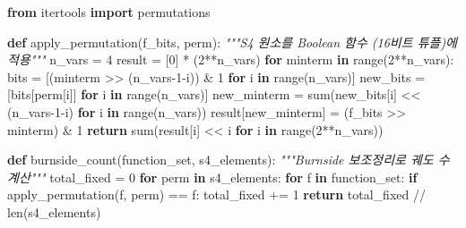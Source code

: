 \documentclass[
]{article}
\newenvironment{Shaded}{}{}
\newcommand{\BuiltInTok}[1]{\textcolor[rgb]{0.00,0.50,0.00}{#1}}
\newcommand{\CommentTok}[1]{\textcolor[rgb]{0.38,0.63,0.69}{\textit{#1}}}
\newcommand{\ControlFlowTok}[1]{\textcolor[rgb]{0.00,0.44,0.13}{\textbf{#1}}}
\newcommand{\DecValTok}[1]{\textcolor[rgb]{0.25,0.63,0.44}{#1}}
\newcommand{\ImportTok}[1]{\textcolor[rgb]{0.00,0.50,0.00}{\textbf{#1}}}
\newcommand{\KeywordTok}[1]{\textcolor[rgb]{0.00,0.44,0.13}{\textbf{#1}}}
\newcommand{\NormalTok}[1]{#1}
\newcommand{\OperatorTok}[1]{\textcolor[rgb]{0.40,0.40,0.40}{#1}}
\begin{document}
\begin{Shaded}
\begin{Highlighting}[]
\ImportTok{from}\NormalTok{ itertools }\ImportTok{import}\NormalTok{ permutations}

\KeywordTok{def}\NormalTok{ apply\_permutation(f\_bits, perm):}
    \CommentTok{"""S4 원소를 Boolean 함수 (16비트 튜플)에 적용"""}
\NormalTok{    n\_vars }\OperatorTok{=} \DecValTok{4}
\NormalTok{    result }\OperatorTok{=}\NormalTok{ [}\DecValTok{0}\NormalTok{] }\OperatorTok{*}\NormalTok{ (}\DecValTok{2}\OperatorTok{**}\NormalTok{n\_vars)}
    \ControlFlowTok{for}\NormalTok{ minterm }\KeywordTok{in} \BuiltInTok{range}\NormalTok{(}\DecValTok{2}\OperatorTok{**}\NormalTok{n\_vars):}
\NormalTok{        bits }\OperatorTok{=}\NormalTok{ [(minterm }\OperatorTok{\textgreater{}\textgreater{}}\NormalTok{ (n\_vars}\OperatorTok{{-}}\DecValTok{1}\OperatorTok{{-}}\NormalTok{i)) }\OperatorTok{\&} \DecValTok{1} \ControlFlowTok{for}\NormalTok{ i }\KeywordTok{in} \BuiltInTok{range}\NormalTok{(n\_vars)]}
\NormalTok{        new\_bits }\OperatorTok{=}\NormalTok{ [bits[perm[i]] }\ControlFlowTok{for}\NormalTok{ i }\KeywordTok{in} \BuiltInTok{range}\NormalTok{(n\_vars)]}
\NormalTok{        new\_minterm }\OperatorTok{=} \BuiltInTok{sum}\NormalTok{(new\_bits[i] }\OperatorTok{\textless{}\textless{}}\NormalTok{ (n\_vars}\OperatorTok{{-}}\DecValTok{1}\OperatorTok{{-}}\NormalTok{i) }\ControlFlowTok{for}\NormalTok{ i }\KeywordTok{in} \BuiltInTok{range}\NormalTok{(n\_vars))}
\NormalTok{        result[new\_minterm] }\OperatorTok{=}\NormalTok{ (f\_bits }\OperatorTok{\textgreater{}\textgreater{}}\NormalTok{ minterm) }\OperatorTok{\&} \DecValTok{1}
    \ControlFlowTok{return} \BuiltInTok{sum}\NormalTok{(result[i] }\OperatorTok{\textless{}\textless{}}\NormalTok{ i }\ControlFlowTok{for}\NormalTok{ i }\KeywordTok{in} \BuiltInTok{range}\NormalTok{(}\DecValTok{2}\OperatorTok{**}\NormalTok{n\_vars))}

\KeywordTok{def}\NormalTok{ burnside\_count(function\_set, s4\_elements):}
    \CommentTok{"""Burnside 보조정리로 궤도 수 계산"""}
\NormalTok{    total\_fixed }\OperatorTok{=} \DecValTok{0}
    \ControlFlowTok{for}\NormalTok{ perm }\KeywordTok{in}\NormalTok{ s4\_elements:}
        \ControlFlowTok{for}\NormalTok{ f }\KeywordTok{in}\NormalTok{ function\_set:}
            \ControlFlowTok{if}\NormalTok{ apply\_permutation(f, perm) }\OperatorTok{==}\NormalTok{ f:}
\NormalTok{                total\_fixed }\OperatorTok{+=} \DecValTok{1}
    \ControlFlowTok{return}\NormalTok{ total\_fixed }\OperatorTok{//} \BuiltInTok{len}\NormalTok{(s4\_elements)}
\end{Highlighting}
\end{Shaded}
\end{document}
